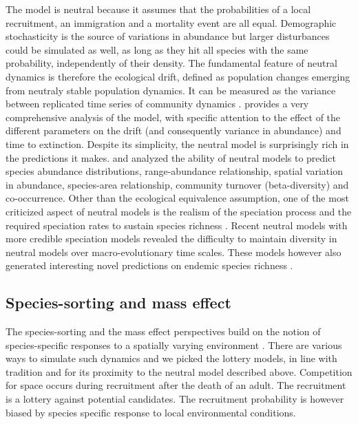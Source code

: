 \documentclass[12pt]{article}
\begin{document}
The model is neutral because it assumes that the probabilities of a local
recruitment, an immigration and a mortality event are all equal. Demographic
stochasticity is the source of variations in abundance but larger disturbances
could be simulated as well, as long as they hit all species with the same
probability, independently of their density. The fundamental feature of neutral
dynamics is therefore the ecological drift, defined as population changes
emerging from neutraly stable population dynamics. It can be measured as the
variance between replicated time series of community dynamics
\parencite{Gravel2011}. \textcite{Hubbell2001} provides a very comprehensive
analysis of the model, with specific attention to the effect of the different
parameters on the drift (and consequently variance in abundance) and time to
extinction. Despite its simplicity, the neutral model is surprisingly rich in
the predictions it makes. \textcite{Bell2001} and \textcite{Hubbell2001}
analyzed the ability of neutral models to predict species abundance
distributions, range-abundance relationship, spatial variation in abundance,
species-area relationship, community turnover (beta-diversity) and
co-occurrence. Other than the ecological equivalence assumption, one of the most
criticized aspect of neutral models is the realism of the speciation process and
the required speciation rates to sustain species richness
\parencite{Ricklefs2003,Etienne2007}. Recent neutral models with more credible
speciation models \parencite{Rosindell2009,Desjardins2012a} revealed the
difficulty to maintain diversity in neutral models over macro-evolutionary time
scales. These models however also generated interesting novel predictions on
endemic species richness \parencite{Rosindell2011,Desjardins2012b}. 

\subsection*{Species-sorting and mass effect}

The species-sorting and the mass effect perspectives build on the notion of
species-specific responses to a spatially varying environment
\parencite{Leibold2004a}. There are various ways to simulate such dynamics and
we picked the lottery models, in line with tradition \parencite{Mouquet2002} and
for its proximity to the neutral model described above. Competition for space
occurs during recruitment after the death of an adult. The recruitment is a
lottery against potential candidates. The recruitment probability is however
biased by species specific response to local environmental conditions. 
\end{document}

